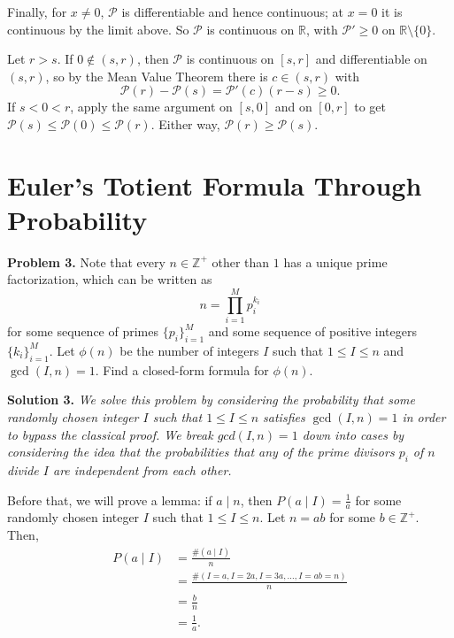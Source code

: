 \documentclass{article}
\begin{document}
\bigskip

Finally, for $x \neq 0$, $\mathcal{P}$ is differentiable and hence continuous;
at $x = 0$ it is continuous by the limit above. So $\mathcal{P}$ is continuous
on $\mathbb{R}$, with $\mathcal{P}' \geq 0$ on $\mathbb{R} \setminus \{0\}$.

Let $r > s$. If $0 \notin (s, r)$, then $\mathcal{P}$ is continuous on $[s, r]$
and differentiable on $(s, r)$, so by the Mean Value Theorem there is
$c \in (s, r)$ with
\[
    \mathcal{P}(r) - \mathcal{P}(s) = \mathcal{P}'(c)(r - s) \geq 0 \text{.}
\]
If $s < 0 < r$, apply the same argument on $[s, 0]$ and on $[0, r]$ to get
$\mathcal{P}(s) \leq \mathcal{P}(0) \leq \mathcal{P}(r)$. Either way,
$\mathcal{P}(r) \geq \mathcal{P}(s)$.

\section{Euler's Totient Formula Through Probability}

\noindent\textbf{Problem 3.} Note that every $n \in \mathbb{Z^+}$ other than $1$ has a unique prime factorization, which can be written as
\[
    n = \prod_{i=1}^{M} p_i^{k_i}
\]
for some sequence of primes $\{ p_i \}_{i=1}^M$ and some sequence of positive integers $\{k_i\}_{i=1}^M$. Let $\phi(n)$ be the number of integers $I$ such that $1 \leq I \leq n$ and $\gcd(I, n) = 1$. Find a closed-form formula for $\phi(n)$.

\bigskip

\noindent\textbf{Solution 3.} \textit{We solve this problem by considering the probability that some randomly chosen integer $I$ such that $1 \leq I \leq n$ satisfies $\gcd(I, n) = 1$ in order to bypass the classical proof. We break $gcd(I, n) = 1$ down into cases by considering the idea that the probabilities that any of the prime divisors $p_i$ of $n$ divide $I$ are independent from each other.} 

\bigskip

Before that, we will prove a lemma: if $a \mid n$, then $P(a \mid I) = \frac{1}{a}$ for some randomly chosen integer $I$ such that $1 \leq I \leq n$. Let $n = ab$ for some $b \in \mathbb{Z^+}$. Then,
\begin{equation*}
    \begin{split}
       P(a \mid I) &= \frac{\#(a \mid I)}{n} \\
       &= \frac{ \#(I = a, I = 2a, I = 3a, \dots, I = ab = n)}{n} \\
       &= \frac{b}{n} \\
       &= \frac{1}{a} \text{.}
    \end{split}
\end{equation*}
\end{document}
